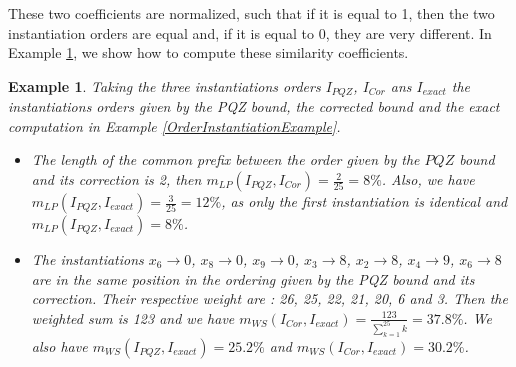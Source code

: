 \documentclass[jair,twoside,11pt,theapa]{article}
\newtheorem{example}[theorem]{Example}
\newcommand{\noteGilles}[1]  {{\color{red}{\sc \scriptsize [Gilles: #1]}}}
\begin{document}
    
    

These two coefficients are normalized, such that if it is equal to 1, then the two instantiation orders are equal and, if it is equal to 0, they are very different. In Example \ref{exampleSimilarity}, we show how to compute these similarity coefficients.

\begin{example}
	Taking the three instantiations orders $I_{PQZ}$, $I_{Cor}$ ans $I_{exact}$ the instantiations orders given by the PQZ bound, the corrected bound and the exact computation in Example \ref{OrderInstantiationExample}.
    \noteGilles{On s'intéresse davantage aux mesures entre chacun et l'exact; est-ce qu'il est utile de mesurer entre les deux bornes?}
    \begin{itemize}
    \item[-] The length of the common prefix between the order given by the $PQZ$ bound and its correction is 2, then $m_{LP}(I_{PQZ}, I_{Cor}) = \frac{2}{25}= 8\%$. Also, we have $m_{LP}(I_{PQZ}, I_{exact}) = \frac{3}{25} = 12\%$, as only the first instantiation is identical and $m_{LP}(I_{PQZ}, I_{exact}) = 8\%$.
    
    \item[-] The instantiations $x_6 \rightarrow 0$, $x_8 \rightarrow 0$, $x_9 \rightarrow 0$, $x_3 \rightarrow 8$, $x_2 \rightarrow 8$, $x_4 \rightarrow 9$, $x_6 \rightarrow 8$  are in the same position in the ordering given by the PQZ bound and its correction. Their respective weight are : 26, 25, 22, 21, 20, 6 and 3. Then the weighted sum is 123 and we have $m_{WS}(I_{Cor}, I_{exact}) = \frac{123}{\sum_{k=1}^{25} k} = 37.8\%$. We also have $m_{WS}(I_{PQZ}, I_{exact}) = 25.2\%$ and $m_{WS}(I_{Cor}, I_{exact}) = 30.2\%$.
    
    \end{itemize}
	\label{exampleSimilarity}
\end{example}
\end{document}
